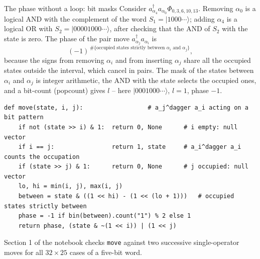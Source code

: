 \documentclass[aspectratio=169,10pt]{beamer}
\newcommand{\ket}[1]{\vert #1\rangle}
\begin{document}
\begin{frame}[fragile]{The phase without a loop: bit masks}
  \small
  Consider $a^{\dagger}_{\alpha_4}a_{\alpha_0}\Phi_{0,3,6,10,13}$. Removing $\alpha_0$ is a logical AND with the complement of the word $S_1=\ket{1000\cdots}$; adding $\alpha_4$ is a logical OR with $S_2=\ket{00001000\cdots}$, after checking that the AND of $S_2$ with the state is zero. The phase of the pair move $a^{\dagger}_{\alpha_j}a_{\alpha_i}$ is
  \[
    (-1)^{\,\#\{\text{occupied states strictly between }\alpha_i\text{ and }\alpha_j\}},
  \]
  because the signs from removing $\alpha_i$ and from inserting $\alpha_j$ share all the occupied states outside the interval, which cancel in pairs. The mask of the states between $\alpha_i$ and $\alpha_j$ is integer arithmetic, the AND with the state selects the occupied ones, and a \alert{bit-count} (popcount) gives $l$ -- here $\ket{0001000\cdots}$, $l=1$, phase $-1$.
\begin{lstlisting}
def move(state, i, j):                  # a_j^dagger a_i acting on a bit pattern
    if not (state >> i) & 1:  return 0, None      # i empty: null vector
    if i == j:                return 1, state     # a_i^dagger a_i counts the occupation
    if (state >> j) & 1:      return 0, None      # j occupied: null vector
    lo, hi = min(i, j), max(i, j)
    between = state & ((1 << hi) - (1 << (lo + 1)))   # occupied states strictly between
    phase = -1 if bin(between).count("1") % 2 else 1
    return phase, (state & ~(1 << i)) | (1 << j)
\end{lstlisting}
  Section 1 of the notebook checks \texttt{move} against two successive single-operator moves for all $32\times25$ cases of a five-bit word.
\end{frame}
\end{document}
